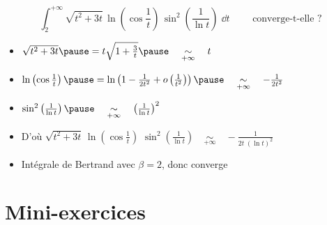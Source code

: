 \begin{frame}

\begin{exemple}
$$
\int_2^{+\infty} 
\sqrt{t^2+3t}\,\ln\left(\cos\frac{1}{t}\right)
\,\sin^2\left(\frac{1}{\ln t}\right)\;\dd t\qquad\text{ converge-t-elle \  ?}
$$
\pause
\begin{itemize}
  \item $\sqrt{t^2+3t} \pause= t\sqrt{1+\frac{3}{t}} \pause\quad  \underset{+\infty}{\sim}\quad   t$
 \pause  
  \item $\ln\left(\cos\frac{1}{t}\right) \pause= 
\ln\left(1-\frac{1}{2t^2}+o\left(\frac{1}{t^2}\right)\right)
\pause\quad \underset{+\infty}{\sim}\quad  -\frac{1}{2t^2}$
 \pause  
  \item $\sin^2\left(\frac{1}{\ln t}\right) 
\pause\quad\underset{+\infty}{\sim}\quad \left(\frac{1}{\ln t}\right)^2$
 \pause
  \item $\text{D'où }\sqrt{t^2+3t}\,\ln\left(\cos\frac{1}{t}\right)\,
\,\sin^2\left(\frac{1}{\ln t}\right)
\quad \underset{+\infty}{\sim}\quad  -\frac{1}{2t\;(\ln t)^2}$
 \pause
  \item Intégrale de Bertrand avec $\beta=2$, donc converge
\end{itemize}
\end{exemple}
\end{frame}

 \section*{Mini-exercices}

